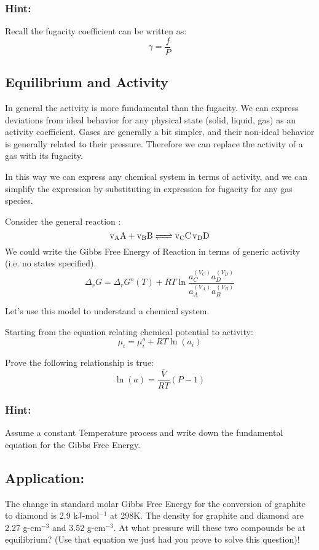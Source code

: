 \documentclass{article}
\newcommand{\be}{\begin{equation}}
\newcommand{\ee}{\end{equation}}
\begin{document}
\subsubsection*{Hint:}
Recall the fugacity coefficient can be written as: 
\be
\gamma = \frac{f}{P}
\ee

\subsection{Equilibrium and Activity}
In general the activity is more fundamental than the fugacity. 
We can express deviations from ideal behavior for any physical state (solid, liquid, gas) as an activity coefficient. 
Gases are generally a bit simpler, and their non-ideal behavior is generally related to their pressure.
Therefore we can replace the activity of a gas with its fugacity.

In this way we can express any chemical system in terms of activity, and we can simplify the expression by substituting in expression for fugacity for any gas species. 

\bigskip

Consider the general reaction : 
\be
\ce{v_AA + v_BB <=> v_CC  v_DD}
\ee
We could write the Gibbs Free Energy of Reaction in terms of generic activity (i.e. no states specified).
\be
\Delta_rG = \Delta_rG^o(T) + RT\ln\frac{a^{(V_C)}_Ca^{(V_D)}_D}{a^{(V_A)}_Aa^{(V_B)}_B}
\ee

Let's use this model to understand a chemical system. 

\bigskip

Starting from the equation relating chemical potential to activity:
\be
\mu_i = \mu^o_i + RT\ln(a_i)
\ee

Prove the following relationship is true:
\be
\ln(a) =  \frac{\bar V}{RT}(P-1)
\ee

\subsubsection*{Hint:}
Assume a constant Temperature process and write down the fundamental equation for the Gibbs Free Energy. 

\subsection{Application:}
The change in standard molar Gibbs Free Energy for the conversion of graphite to diamond is 2.9 kJ-mol$^{-1}$ at 298K. 
The density for graphite and diamond are 2.27 g-cm$^{-3}$ and 3.52 g-cm$^{-3}$. 
At what pressure will these two compounds be at equilibrium?
(Use that equation we just had you prove to solve this question)!
\end{document}
